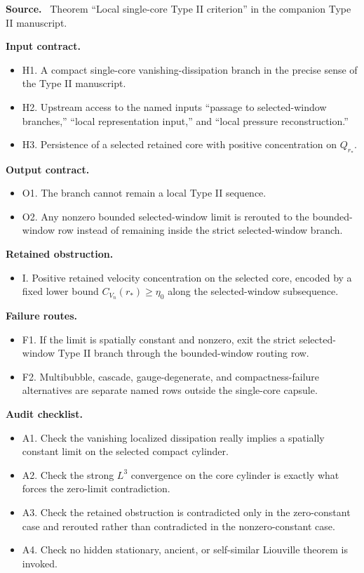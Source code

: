 \documentclass[11pt]{amsart}
\newcommand{\capsulefield}[1]{\par\smallskip\noindent\textbf{#1.}\ }
\begin{document}
\capsulefield{Source}
Theorem ``Local single-core Type II criterion'' in the companion Type II
manuscript.

\capsulefield{Input contract}
\begin{itemize}
  \item H1. A compact single-core vanishing-dissipation branch in the precise sense of the Type II manuscript.
  \item H2. Upstream access to the named inputs ``passage to selected-window branches,'' ``local representation input,'' and ``local pressure reconstruction.''
  \item H3. Persistence of a selected retained core with positive concentration on \(Q_{r_*}\).
\end{itemize}

\capsulefield{Output contract}
\begin{itemize}
  \item O1. The branch cannot remain a local Type II sequence.
  \item O2. Any nonzero bounded selected-window limit is rerouted to the bounded-window row instead of remaining inside the strict selected-window branch.
\end{itemize}

\capsulefield{Retained obstruction}
\begin{itemize}
  \item I. Positive retained velocity concentration on the selected core, encoded by a fixed lower bound \(C_{V_n}(r_*)\ge \eta_0\) along the selected-window subsequence.
\end{itemize}

\capsulefield{Failure routes}
\begin{itemize}
  \item F1. If the limit is spatially constant and nonzero, exit the strict selected-window Type II branch through the bounded-window routing row.
  \item F2. Multibubble, cascade, gauge-degenerate, and compactness-failure alternatives are separate named rows outside the single-core capsule.
\end{itemize}

\capsulefield{Audit checklist}
\begin{itemize}
  \item A1. Check the vanishing localized dissipation really implies a spatially constant limit on the selected compact cylinder.
  \item A2. Check the strong \(L^3\) convergence on the core cylinder is exactly what forces the zero-limit contradiction.
  \item A3. Check the retained obstruction is contradicted only in the zero-constant case and rerouted rather than contradicted in the nonzero-constant case.
  \item A4. Check no hidden stationary, ancient, or self-similar Liouville theorem is invoked.
\end{itemize}
\end{document}
